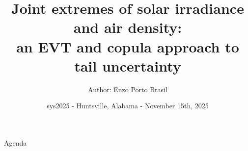 \documentclass[aspectratio=169]{beamer}
\title[Joint extremes of solar irradiance and air density]{%
  Joint extremes of solar irradiance and air density: \\ an EVT and copula approach to tail uncertainty}
\author[BRASIL, E. P]{\large{Author: Enzo Porto Brasil \\[-0.35cm] }}
\institute[]{\\[1.2cm] 
             \small{Department of Statistics, University of Brasília, Brazil} \\[-0.45cm]}
\date[]{\small{sys2025 - Huntsville, Alabama - November 15th, 2025}}
\begin{document}
\begin{frame}
  \titlepage
\end{frame}



{\begin{frame}{Agenda}
  \tableofcontents
\end{frame}
}









\end{document}
